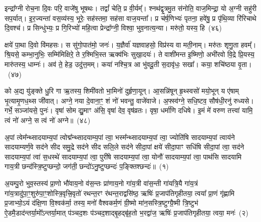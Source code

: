 इन्द्रा᳚ग्नी रोच॒ना दि॒वः परि॒ वाजे॑षु भूषथः। तद्वां᳚ चेति॒ प्र वी॒र्यम्᳚। श्नथ॑द्वृ॒त्रमु॒त स॑नोति॒ वाज॒मिन्द्रा॒ यो अ॒ग्नी सहु॑री सप॒र्यात्। इ॒र॒ज्यन्ता॑ वस॒व्य॑स्य॒ भूरेः॒ सह॑स्तमा॒ सह॑सा वाज॒यन्ता᳚। प्र च॑र्\mbox{}ष॒णिभ्यः॑ पृतना॒ हवे॑षु॒ प्र पृ॑थि॒व्या रि॑रिचाथे दि॒वश्च॑। प्र सिन्धु॑भ्यः॒ प्र गि॒रिभ्यो॑ महि॒त्वा प्रेन्द्रा᳚ग्नी॒ विश्वा॒ भुव॒नात्य॒न्या। मरु॑तो॒ यस्य॒ हि~(४६)

क्षये॑ पा॒था दि॒वो वि॑महसः। स सु॑गो॒पात॑मो॒ जनः॑। य॒ज्ञैर्वा॑ यज्ञवाहसो॒ विप्र॑स्य वा मती॒नाम्। मरु॑तः शृणु॒ता हवम्᳚। श्रि॒यसे॒ कम्भा॒नुभिः॒ सम्मि॑मिक्षिरे॒ ते र॒श्मिभि॒स्त ऋक्व॑भिः सुखा॒दयः॑। ते वाशी॑मन्त इ॒ष्मिणो॒ अभी॑रवो वि॒द्रे प्रि॒यस्य॒ मारु॑तस्य॒ धाम्नः॑। अव॑ ते॒ हेड॒ उदु॑त्त॒मम्। कया॑ नश्चि॒त्र आ भु॑वदू॒ती स॒दावृ॑धः॒ सखा᳚। कया॒ शचि॑ष्ठया वृ॒ता।~(४७)

को अ॒द्य यु॑ङ्क्ते धु॒रि गा ऋ॒तस्य॒ शिमी॑वतो भा॒मिनो॑ दुर्\mbox{}हृणा॒यून्। आ॒सन्नि॑षून् हृ॒थ्स्वसो॑ मयो॒भून् य ए॑षाम् भृ॒त्यामृ॒णध॒थ्स जी॑वात्। अग्ने॒ नया दे॒वाना॒ꣳ॒ शं नो॑ भवन्तु॒ वाजे॑वाजे। अ॒फ्स्व॑ग्ने॒ सधि॒ष्टव॒ सौष॑धी॒रनु॑ रुध्यसे। गर्भे॒ सञ्जा॑यसे॒ पुनः॑। वृषा॑ सोम द्यु॒माꣳ अ॑सि॒ वृषा॑ देव॒ वृष॑व्रतः। वृषा॒ धर्मा॑णि दधिषे। इ॒मं मे॑ वरुण तत्त्वा॑ यामि॒ त्वं नो॑ अग्ने॒ स त्वं नो॑ अग्ने॥~(४८)

{\anuvakamend[{हि वृ॒ता म॒ एका॑\-दश च}]}%


{\anuvakamend[{अ॒पां त्वेम॑न्न॒यं पु॒रो भुवः॒ प्राची᳚ ध्रु॒वक्षि॑ति॒स्त्र्यवि॒रिन्द्रा᳚ग्नी॒ मा छन्द॑ आ॒शुस्त्रि॒वृद॒ग्नेर्भा॒गो᳚\-ऽस्येक॑ये॒यमे॒व सा याग्ने॑ जा॒तान॒ग्निर्वृ॒त्राणि॒ त्रयो॑दश}]}%
{}

\setcounter{anuvakam}{0}
अ॒पां त्वेम᳚न्थ्सादयाम्य॒पां त्वोद्म᳚न्थ्सादयाम्य॒पां त्वा॒ भस्म᳚न्थ्सादयाम्य॒पां त्वा॒ ज्योति॑षि सादयाम्य॒पां त्वाय॑ने सादयाम्यर्ण॒वे सद॑ने सीद समु॒द्रे सद॑ने सीद सलि॒ले सद॑ने सीदा॒पां क्षये॑ सीदा॒पाꣳ सधि॑षि सीदा॒पां त्वा॒ सद॑ने सादयाम्य॒पां त्वा॑ स॒धस्थे॑ सादयाम्य॒पां त्वा॒ पुरी॑षे सादयाम्य॒पां त्वा॒ योनौ॑ सादयाम्य॒पां त्वा॒ पाथ॑सि सादयामि गाय॒त्री छन्द॑स्त्रि॒ष्टुप्छन्दो॒ जग॑ती॒ छन्दो॑\-ऽनु॒ष्टुप्छन्दः॑ प॒ङ्क्तिश्छन्दः॑॥~(१)

{\anuvakamend[{योनौ॒ पञ्च॑दश च}]}%

अ॒यम्पु॒रो भुव॒स्तस्य॑ प्रा॒णो भौ॑वाय॒नो व॑स॒न्तः प्रा॑णाय॒नो गा॑य॒त्री वा॑स॒न्ती गा॑यत्रि॒यै गा॑य॒त्रं गा॑य॒त्रादु॑पा॒ꣳ॒शु\-रु॑पा॒ꣳ॒शोस्त्रि॒वृत्त्रि॒वृतो॑ रथन्त॒रꣳ र॑थन्त॒राद्वसि॑ष्ठ॒ ऋषिः॑ प्र॒जा\-प॑तिगृहीतया॒ त्वया᳚ प्रा॒णं गृ॑ह्णामि प्र॒जाभ्यो॒\-ऽयं द॑क्षि॒णा वि॒श्वक॑र्मा॒ तस्य॒ मनो॑ वैश्वकर्म॒णं ग्री॒ष्मो मा॑न॒सस्त्रि॒ष्टुग्ग्रै॒ष्मी त्रि॒ष्टुभ॑ ऐ॒डमै॒डाद॑न्तर्या॒मो᳚\-ऽन्तर्या॒मात् प॑ञ्चद॒शः प॑ञ्चद॒शाद्बृ॒हद्बृ॑ह॒तो भ॒रद्वा॑ज॒ ऋषिः॑ प्र॒जा\-प॑तिगृहीतया॒ त्वया॒ मनः॑~(२)

